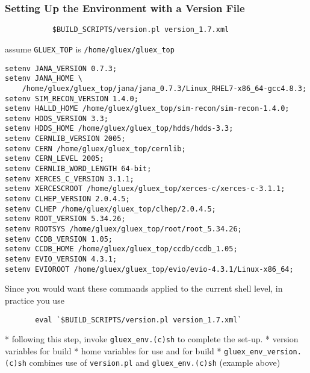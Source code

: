 \documentclass[xcolor=dvipsnames,hyperref={pdfpagelabels=false}]{beamer}
\begin{document}
\begin{frame}[fragile]
  \frametitle{Setting Up the Environment with a Version File}

\begin{verbatim}
           $BUILD_SCRIPTS/version.pl version_1.7.xml
\end{verbatim}
assume {\tt GLUEX\_TOP} is {\tt /home/gluex/gluex\_top}

{\small
\begin{verbatim}
setenv JANA_VERSION 0.7.3;
setenv JANA_HOME \
    /home/gluex/gluex_top/jana/jana_0.7.3/Linux_RHEL7-x86_64-gcc4.8.3;
setenv SIM_RECON_VERSION 1.4.0;
setenv HALLD_HOME /home/gluex/gluex_top/sim-recon/sim-recon-1.4.0;
setenv HDDS_VERSION 3.3;
setenv HDDS_HOME /home/gluex/gluex_top/hdds/hdds-3.3;
setenv CERNLIB_VERSION 2005;
setenv CERN /home/gluex/gluex_top/cernlib;
setenv CERN_LEVEL 2005;
setenv CERNLIB_WORD_LENGTH 64-bit;
setenv XERCES_C_VERSION 3.1.1;
setenv XERCESCROOT /home/gluex/gluex_top/xerces-c/xerces-c-3.1.1;
setenv CLHEP_VERSION 2.0.4.5;
setenv CLHEP /home/gluex/gluex_top/clhep/2.0.4.5;
setenv ROOT_VERSION 5.34.26;
setenv ROOTSYS /home/gluex/gluex_top/root/root_5.34.26;
setenv CCDB_VERSION 1.05;
setenv CCDB_HOME /home/gluex/gluex_top/ccdb/ccdb_1.05;
setenv EVIO_VERSION 4.3.1;
setenv EVIOROOT /home/gluex/gluex_top/evio/evio-4.3.1/Linux-x86_64;
\end{verbatim}
}
Since you would want these commands applied to the current shell level, in practice you use
\begin{verbatim}
       eval `$BUILD_SCRIPTS/version.pl version_1.7.xml`
\end{verbatim}
* following this step, invoke {\tt gluex\_env.(c)sh} to complete the set-up.
* version variables for build
* home variables for use and for build
* {\tt gluex\_env\_version.(c)sh} combines use of {\tt version.pl} and {\tt gluex\_env.(c)sh} (example above)

\end{frame}
\end{document}

